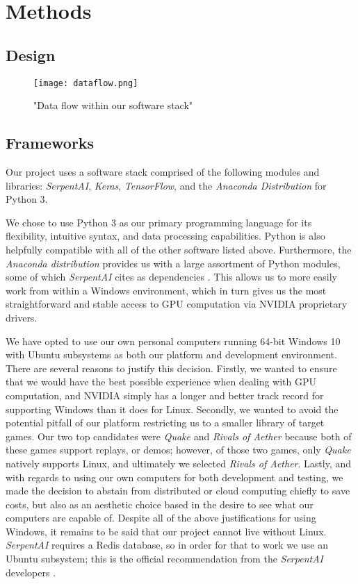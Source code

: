 \chapter{Methods}


\section{Design}

\begin{figure}
	\caption{"Data flow within our software stack"}
	\centering
		\texttt{[image: dataflow.png]} \\
\end{figure}



\section{Frameworks}

Our project uses a software stack comprised of the following modules and libraries: {\it SerpentAI}, {\it Keras}, {\it TensorFlow}, and the {\it Anaconda Distribution} for Python 3.

We chose to use Python 3 as our primary programming language for its flexibility, intuitive syntax, and data processing capabilities. Python is also helpfully compatible with all of the other software listed above. Furthermore, the {\it Anaconda distribution} provides us with a large assortment of Python modules, some of which {\it SerpentAI} cites as dependencies \cite{SerpentAI}. This allows us to more easily work from within a Windows environment, which in turn gives us the most straightforward and stable access to GPU computation via NVIDIA proprietary drivers.

We have opted to use our own personal computers running 64-bit Windows 10 with Ubuntu subsystems as both our platform and development environment. There are several reasons to justify this decision. Firstly, we wanted to ensure that we would have the best possible experience when dealing with GPU computation, and NVIDIA simply has a longer and better track record for supporting Windows than it does for Linux. Secondly, we wanted to avoid the potential pitfall of our platform restricting us to a smaller library of target games. Our two top candidates were {\it Quake} and {\it Rivals of Aether} because both of these games support replays, or demos; however, of those two games, only {\it Quake} natively supports Linux, and ultimately we selected {\it Rivals of Aether}. Lastly, and with regards to using our own computers for both development and testing, we made the decision to abstain from distributed or cloud computing chiefly to save costs, but also as an aesthetic choice based in the desire to see what our computers are capable of. Despite all of the above justifications for using Windows, it remains to be said that our project cannot live without Linux. {\it SerpentAI} requires a Redis database, so in order for that to work we use an Ubuntu subsystem; this is the official recommendation from the {\it SerpentAI} developers \cite{SerpentAI}.

